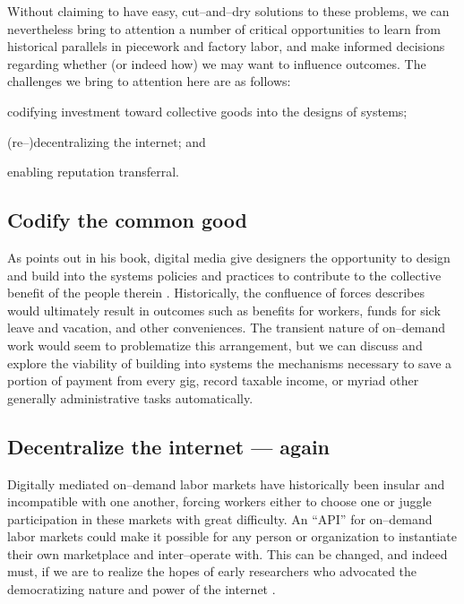 \documentclass[chi_draft]{sigchi}
\begin{document}
{  Without claiming to have easy, cut--and--dry solutions to these problems,
  we can nevertheless bring to attention a number of critical opportunities to
  learn from historical parallels in piecework and factory labor,
  and make informed decisions regarding whether
  (or indeed how)
  we may want to influence outcomes.
  The challenges we bring to attention here are as follows:
  \begin{inlinelist}
    \item codifying investment toward collective goods into the designs of systems;
    \item (re--)decentralizing the internet; and
    \item enabling reputation transferral.
  \end{inlinelist}


  \subsection{Codify the common good}
  As \citeauthor{lessig2006code} points out in his book,
  digital media give designers the opportunity to design and build into the systems
  policies and practices to contribute to the collective benefit of the people therein
  \cite{lessig2006code}.
  Historically, the confluence of forces \citeauthor{lessig2006code} describes
  would ultimately result in outcomes such as benefits for workers,
  funds for sick leave and vacation, and other conveniences.
  The transient nature of on--demand work would seem to problematize this arrangement,
  but we can discuss and explore the viability of building into systems the mechanisms necessary
  to save a portion of payment from every gig,
  record taxable income, or
  myriad other generally administrative tasks automatically.


  \subsection{Decentralize the internet --- again}
  Digitally mediated on--demand labor markets have historically been insular and incompatible with one another,
  forcing workers either to choose one or juggle participation in these markets with great difficulty.
  An ``API'' for on--demand labor markets could make it possible for any person
  or organization to instantiate their own marketplace and inter--operate with.
  This can be changed, and indeed must, if we are to realize the hopes of early researchers who advocated the
  democratizing nature and power of the internet
  \cite{barlow2009declaration,lanier2014owns}.

}
\end{document}
